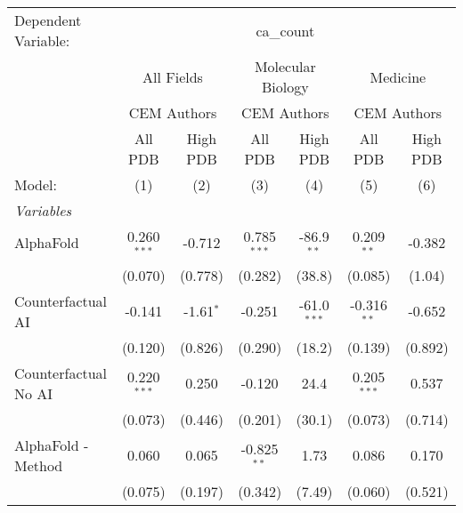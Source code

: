 \begingroup
\centering
\begin{tabular}{lcccccc}
   \tabularnewline \midrule \midrule
   Dependent Variable: & \multicolumn{6}{c}{ca\_count}\\
 & \multicolumn{2}{c}{All Fields} & \multicolumn{2}{c}{Molecular Biology} & \multicolumn{2}{c}{Medicine} \\
\cmidrule(lr){2-3} \cmidrule(lr){4-5} \cmidrule(lr){6-7}
 & \multicolumn{2}{c}{CEM Authors} & \multicolumn{2}{c}{CEM Authors} & \multicolumn{2}{c}{CEM Authors} \\
\cmidrule(lr){2-3} \cmidrule(lr){4-5} \cmidrule(lr){6-7}
 & \multicolumn{1}{c}{All PDB} & \multicolumn{1}{c}{High PDB} & \multicolumn{1}{c}{All PDB} & \multicolumn{1}{c}{High PDB} & \multicolumn{1}{c}{All PDB} & \multicolumn{1}{c}{High PDB} \\
\cmidrule(lr){2-2} \cmidrule(lr){3-3} \cmidrule(lr){4-4} \cmidrule(lr){5-5} \cmidrule(lr){6-6} \cmidrule(lr){7-7}
   Model:                                                     & (1)           & (2)         & (3)           & (4)           & (5)           & (6)\\  
   \midrule
   \emph{Variables}\\
   AlphaFold                                                  & 0.260$^{***}$ & -0.712      & 0.785$^{***}$ & -86.9$^{**}$  & 0.209$^{**}$  & -0.382\\   
                                                              & (0.070)       & (0.778)     & (0.282)       & (38.8)        & (0.085)       & (1.04)\\   
   Counterfactual AI                                          & -0.141        & -1.61$^{*}$ & -0.251        & -61.0$^{***}$ & -0.316$^{**}$ & -0.652\\   
                                                              & (0.120)       & (0.826)     & (0.290)       & (18.2)        & (0.139)       & (0.892)\\   
   Counterfactual No AI                                       & 0.220$^{***}$ & 0.250       & -0.120        & 24.4          & 0.205$^{***}$ & 0.537\\   
                                                              & (0.073)       & (0.446)     & (0.201)       & (30.1)        & (0.073)       & (0.714)\\   
   AlphaFold - Method                                         & 0.060         & 0.065       & -0.825$^{**}$ & 1.73          & 0.086         & 0.170\\   
                                                              & (0.075)       & (0.197)     & (0.342)       & (7.49)        & (0.060)       & (0.521)\\   

\end{tabular}
